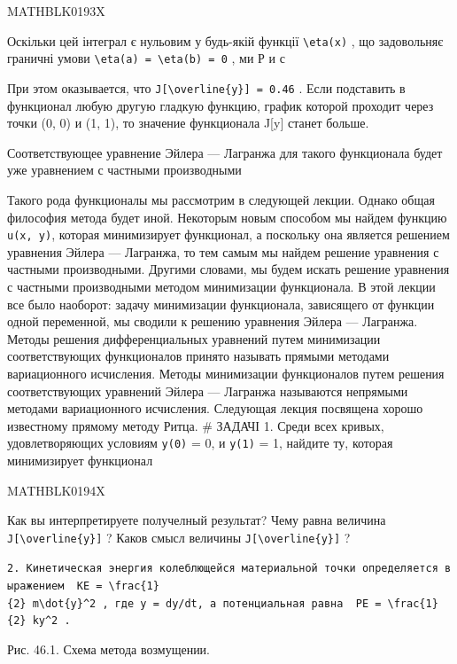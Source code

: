 \documentclass[
  ukrainian,
]{article}
\begin{document}
MATHBLK0193X

Оскільки цей інтеграл є нульовим у будь-якій функції
\texttt{\textbackslash{}eta(x)} , що задовольняє граничні умови
\texttt{\textbackslash{}eta(a)\ =\ \textbackslash{}eta(b)\ =\ 0} , ми Р
и с

При этом оказывается, что
\texttt{J{[}\textbackslash{}overline\{y\}{]}\ =\ 0.46} . Если подставить
в функционал любую другую гладкую функцию, график которой проходит через
точки (0, 0) и (1, 1), то значение функционала J{[}y{]} станет больше.

Соответствующее уравнение Эйлера --- Лагранжа для такого функционала
будет уже уравнением с частными производными

Такого рода функционалы мы рассмотрим в следующей лекции. Однако общая
философия метода будет иной. Некоторым новым способом мы найдем функцию
\texttt{u(x,\ y)}, которая минимизирует функционал, а поскольку она
является решением уравнения Эйлера --- Лагранжа, то тем самым мы найдем
решение уравнения с частными производными. Другими словами, мы будем
искать решение уравнения с частными производными методом минимизации
функционала. В этой лекции все было наоборот: задачу минимизации
функционала, зависящего от функции одной переменной, мы сводили к
решению уравнения Эйлера --- Лагранжа. Методы решения дифференциальных
уравнений путем минимизации соответствующих функционалов принято
называть прямыми методами вариационного исчисления. Методы минимизации
функционалов путем решения соответствующих уравнений Эйлера --- Лагранжа
называются непрямыми методами вариационного исчисления. Следующая лекция
посвящена хорошо известному прямому методу Ритца. \# ЗАДАЧІ 1. Среди
всех кривых, удовлетворяющих условиям \texttt{y(0)} = 0, и \texttt{y(1)}
= 1, найдите ту, которая минимизирует функционал

MATHBLK0194X

Как вы интерпретируете получелный результат? Чему равна величина
\texttt{J{[}\textbackslash{}overline\{y\}{]}} ? Каков смысл величины
\texttt{J{[}\textbackslash{}overline\{y\}{]}} ?

\texttt{2.\ Кинетическая\ энергия\ колеблющейся\ материальной\ точки\ определяется\ выражением\ \ \textquotesingle{}KE\ =\ \textbackslash{}frac\{1\}\{2\}\ m\textbackslash{}dot\{y\}\^{}2\textquotesingle{}\ ,\ где\ y\ =\ dy/dt,\ а\ потенциальная\ равна\ \ \textquotesingle{}PE\ =\ \textbackslash{}frac\{1\}\{2\}\ ky\^{}2\textquotesingle{}\ .}

Рис. 46.1. Схема метода возмущении.
\end{document}
